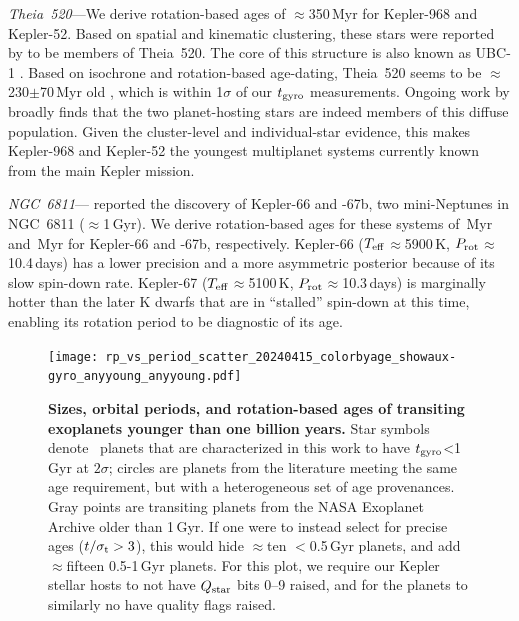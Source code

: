 \documentclass[11pt,twocolumn,tighten,linenumbers]{aastex63}
\begin{document}
{\it Theia~520}---We derive rotation-based ages of $\approx$350\,Myr
for Kepler-968 and Kepler-52.  Based on spatial and kinematic
clustering, these stars were reported by \citet{2019AJ....158..122K}
to be members of Theia~520.  The core of this structure is also known
as UBC-1 \citep{2018A&A...618A..59C}.  Based on isochrone and
rotation-based age-dating, Theia~520 seems to be
$\approx$230$\pm$70\,Myr old
\citep{2019AJ....158..122K,2024A&A...681A..13F}, which is within
1$\sigma$ of our $t_{\rm gyro}$ measurements.  Ongoing work by
\citet{Curtis2024} broadly finds that the two planet-hosting stars are
indeed members of this diffuse population.  Given the cluster-level
and individual-star evidence, this makes Kepler-968 and Kepler-52 the
youngest multiplanet systems currently known from the main Kepler
mission.

{\it NGC~6811}---\citet{Meibom_2013} reported the discovery of
Kepler-66 and -67b, two mini-Neptunes in NGC~6811 ($\approx$1\,Gyr).
We derive rotation-based ages for these systems of
\kepsixsixtgyro\,Myr and \kepsixseventgyro\,Myr for Kepler-66 and
-67b, respectively.  Kepler-66 ($T_{\rm eff}$$\approx$5900\,K, $P_{\rm
rot}$$\approx$10.4\,days) has a lower precision and a more asymmetric
posterior because of its slow spin-down rate.  Kepler-67 ($T_{\rm
eff}$$\approx$5100\,K, $P_{\rm rot}$$\approx$10.3\,days) is marginally
hotter than the later K dwarfs that are in ``stalled'' spin-down at
this time, enabling its rotation period to be diagnostic of its age.

\begin{figure}[!t]
  \begin{center}
    \texttt{[image: rp\_vs\_period\_scatter\_20240415\_colorbyage\_showaux-gyro\_anyyoung\_anyyoung.pdf]}
  \end{center}
  \vspace{-0.5cm}
  \caption{
    {\bf Sizes, orbital periods, and rotation-based ages of transiting
    exoplanets younger than one billion years.} Star symbols denote
    \nplyounggyrotwosigmanograzingnoruwe\ planets that are
    characterized in this work to have $t_{\rm gyro}$<1\,Gyr at
    $2$$\sigma$; circles are planets from the literature meeting the
    same age requirement, but with a heterogeneous set of age
    provenances.  Gray points are transiting planets from the NASA
    Exoplanet Archive older than 1\,Gyr.  If one were to instead
    select for precise ages ($t/\sigma_{\rm t}>3$), this would hide
    $\approx$ten $<$0.5\,Gyr planets, and add $\approx$fifteen
    0.5-1\,Gyr planets.  For this plot, we require our Kepler stellar
    hosts to not have $Q_{\rm star}$ bits 0--9 raised, and for the
    planets to similarly no have quality flags raised. 
    \label{fig:rp_period_age_results}
  }
\end{figure}
\end{document}
